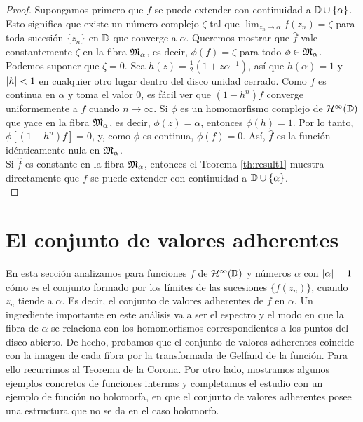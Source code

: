 \begin{proof}
    Supongamos primero que $f$ se puede extender con continuidad a $\mathbb{D} \cup \{ \alpha\}$. Esto significa que existe un número complejo $\zeta$ tal que $\lim_{z_n \to \alpha} f(z_n) = \zeta$ para toda sucesión $\{z_n\}$ en $\mathbb{D}$ que converge a $\alpha$. Queremos mostrar que $\widehat f$ vale constantemente $\zeta$ en la fibra $\mathfrak{M}_\alpha$, es decir, $\phi(f) = \zeta$ para todo $\phi \in \mathfrak{M}_\alpha$. \\

    Podemos suponer que $\zeta = 0$. Sea $h(z) = \frac{1}{2} (1 + z \alpha^{-1})$, así que $h(\alpha) = 1$ y $\left\lvert h\right\rvert < 1$ en cualquier otro lugar dentro del disco unidad cerrado. Como $f$ es continua en $\alpha$ y toma el valor $0$, es fácil ver que $(1 - h^n) f$ converge uniformemente a $f$ cuando $n \to \infty$. Si $\phi$ es un homomorfismo complejo de $\mathcal{H}^{\infty}(\mathbb{D})$ que yace en la fibra $\mathfrak{M}_\alpha$, es decir, $\phi (z) = \alpha$, entonces $\phi (h) = 1$. Por lo tanto, $\phi [(1 - h^n)f] = 0$, y, como $\phi$ es continua, $\phi (f) = 0$. Así, $\widehat f$ es la función idénticamente nula en $\mathfrak{M}_\alpha$. \\


    Si $\widehat f$ es constante en la fibra $\mathfrak{M}_\alpha$, entonces el Teorema \ref{th:result1} muestra directamente que $f$ se puede extender con continuidad a $\mathbb{D} \cup \{ \alpha \}$. \\
\end{proof}

\section{El conjunto de valores adherentes}

En esta sección analizamos para funciones $f$ de $\mathcal{H}^{\infty}(\mathbb{D})$ y números $\alpha$ con $\left\lvert\alpha\right\rvert = 1$ cómo es el conjunto formado por los límites de las sucesiones $\{f(z_n)\}$, cuando $z_n$ tiende a $\alpha$. Es decir, el conjunto de valores adherentes de $f$ en $\alpha$. Un ingrediente importante en este análisis va a ser el espectro y el modo en que la fibra de $\alpha$ se relaciona con los homomorfismos correspondientes a los puntos del disco abierto. De hecho, probamos que el conjunto de valores adherentes coincide con la imagen de cada fibra por la transformada de Gelfand de la función. Para ello recurrimos al Teorema de la Corona. Por otro lado, mostramos algunos ejemplos concretos de funciones internas y completamos el estudio con un ejemplo de función no holomorfa, en que el conjunto de valores adherentes posee una estructura que no se da en el caso holomorfo. \\

